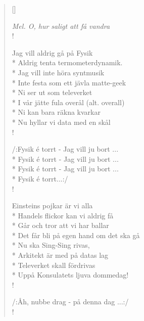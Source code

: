 \settowidth{\versewidth}{Vi kan bara räkna kvarkar}


\begin{verse}[\versewidth]

\flagverse{}
\emph{Mel. O, hur saligt att få vandra}\\!

Jag vill aldrig gå på Fysik\\*
Aldrig tenta termometerdynamik.\\*
Jag vill inte höra syntmusik\\*
Inte festa som ett jävla matte-geek\\*
Ni ser ut som televerket\\*
I vår jätte fula overål (alt. overall)\\*
Ni kan bara räkna kvarkar\\*
Nu hyllar vi data med en skål\\!


/:Fysik é torrt - Jag vill ju bort ...\\*
Fysik é torrt - Jag vill ju bort ...\\*
Fysik é torrt - Jag vill ju bort ...\\*
Fysik é torrt...:/\\!


Einsteins pojkar är vi alla\\*
Handels flickor kan vi aldrig få\\*
Går och tror att vi har ballar\\*
Det får bli på egen hand om det ska gå\\*
Nu ska Sing-Sing rivas,\\*
Arkitekt är med på datas lag\\*
Televerket skall fördrivas\\*
Uppå Konsulatets ljuva dommedag!\\!


/:Åh, nubbe drag - på denna dag ...:/\\!




\end{verse}

